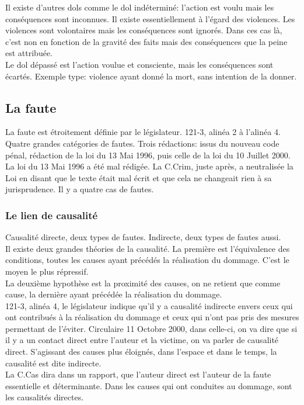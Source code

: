 \documentclass[10pt, a4paper, openany]{book}
\begin{document}
Il existe d'autres dols comme le dol indéterminé: l'action est voulu mais les conséquences sont inconnues. Il existe essentiellement à l'égard des violences. Les violences sont volontaires mais les conséquences sont ignorés. Dans ces cas là, c'est non en fonction de la gravité des faits mais des conséquences que la peine est attribuée. \\
Le dol dépassé est l'action voulue et consciente, mais les conséquences sont écartés. Exemple type: violence ayant donné la mort, sans intention de la donner. 

\subsection{La faute}

La faute est étroitement définie par le législateur. 121-3, alinéa 2 à l'alinéa 4. Quatre grandes catégories de fautes. Trois rédactions: issus du nouveau code pénal, rédaction de la loi du 13 Mai 1996, puis celle de la loi du 10 Juillet 2000. \\
La loi du 13 Mai 1996 a été mal rédigée. La C.Crim, juste après, a neutralisée la Loi en disant que le texte était mal écrit et que cela ne changeait rien à sa jurisprudence. Il y a quatre cas de fautes. 

\subsubsection{Le lien de causalité}

Causalité directe, deux types de fautes. Indirecte, deux types de fautes aussi. \\
Il existe deux grandes théories de la causalité. La première est l'équivalence des conditions, toutes les causes ayant précédés la réalisation du dommage. C'est le moyen le plus répressif. \\
La deuxième hypothèse est la proximité des causes, on ne retient que comme cause, la dernière ayant précédée la réalisation du dommage. \\
121-3, alinéa 4, le législateur indique qu'il y a causalité indirecte envers ceux qui ont contribués à la réalisation du dommage et ceux qui n'ont pas pris des mesures permettant de l'éviter. Circulaire 11 Octobre 2000, dans celle-ci, on va dire que si il y a un contact direct entre l'auteur et la victime, on va parler de causalité direct. S'agissant des causes plus éloignés, dans l'espace et dans le temps, la causalité est dite indirecte. \\
La C.Cas dira dans un rapport, que l'auteur direct est l'auteur de la faute essentielle et déterminante. Dans les causes qui ont conduites au dommage, sont les causalités directes. 
\end{document}

